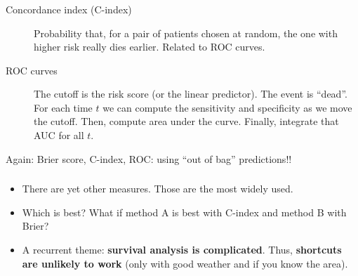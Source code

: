 \begin{frame}
\frametitle{}
\begin{description}
\item[Concordance index (C-index)] Probability that, for a pair of
  patients chosen at random, the one with higher risk really dies
  earlier. Related to ROC curves.
  
\item[ROC curves] The cutoff is the risk score (or the linear
  predictor). The event is ``dead''. For each time $t$ we can compute the
  sensitivity and specificity as we move the cutoff. Then, compute area
  under the curve. Finally, integrate that AUC for all $t$.
\end{description}

Again: Brier score, C-index, ROC: using ``out of bag'' predictions!!

\end{frame}


\begin{frame}
\frametitle{}
\begin{itemize}
\item There are yet other measures. Those are the most widely used.
\item Which is best? What if method A is best with C-index and method B
  with Brier?
\item A recurrent theme: \textbf{survival analysis is complicated}. Thus,
  \textbf{shortcuts are unlikely to work} (only with good weather and if
  you know the area).
\end{itemize}
\end{frame}







